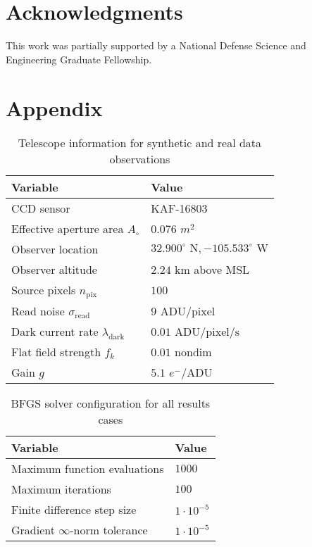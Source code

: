 \documentclass[a4paper,twocolumn]{spaceDebrisC} %
\begin{document}
\section*{Acknowledgments}

This work was partially supported by a National Defense Science and Engineering Graduate Fellowship.

\section*{Appendix}

\begin{table}[H]
  \centering
  \caption{Telescope information for synthetic and real data observations}
  \vspace*{6pt}
  \begin{tabular}{|l|l|}
  \hline
  \textbf{Variable} & \textbf{Value} \\ \hline
 CCD sensor & KAF-16803 \\ \hline
 Effective aperture area $A_\circ$ & $0.076$ $m^2$ \\ \hline
 Observer location & $32.900^\circ \textrm{ N}, -105.533^\circ \textrm{ W}$ \\ \hline
 Observer altitude & $2.24$ km above MSL \\ \hline
 Source pixels $n_\text{pix}$ & $100$ \\ \hline
 Read noise $\sigma_\text{read}$ & $9$ $\text{ADU} / \text{pixel}$ \\ \hline
 Dark current rate $\lambda_\text{dark}$ & $0.01$ $\text{ADU} / \text{pixel} / \text{s}$ \\ \hline
 Flat field strength $f_k$ & $0.01$ nondim \\ \hline
 Gain $g$ & $5.1$ $e^- / \text{ADU}$ \\ \hline
  \end{tabular}
  \label{tb:tele_info}
 \end{table}

 \begin{table}[H]
  \centering
  \caption{BFGS solver configuration for all results cases}
  \vspace*{6pt}
  \begin{tabular}{|l|l|}
  \hline
  \textbf{Variable} & \textbf{Value} \\ \hline
 Maximum function evaluations & $1000$ \\ \hline
 Maximum iterations & $100$ \\ \hline
 Finite difference step size & $1 \cdot 10^{-5}$ \\ \hline
 Gradient $\infty$-norm tolerance & $1 \cdot 10^{-5}$ \\ \hline
  \end{tabular}
  \label{tb:bfgs_info}
 \end{table}


\end{document}
